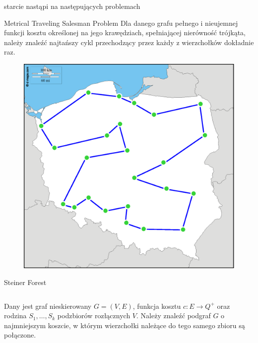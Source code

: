 \documentclass[final,hyperref={pdfpagelabels=false}]{beamer}
\begin{document}
\begin{frame}
  \begin{columns}		
    \begin{column}{.96\textwidth}
      \vspace{1cm}
      \begin{center}
        \veryHuge starcie nastąpi na następujących problemach
      \end{center}
      \vspace{1cm}

      \begin{block}{Metrical Traveling Salesman Problem}
        Dla danego grafu pełnego i nieujemnej funkcji kosztu określonej na jego krawędziach,
		spełniającej nierówność trójkąta, należy znaleźć najtańszy cykl przechodzący
		przez każdy z wierzchołków dokładnie raz.
		\begin{figure}
			\centering
			\includegraphics{poland_cities_cycle.eps}
		\end{figure}
      \end{block}

      \begin{block}{Steiner Forest}
        \begin{minipage}{.48\linewidth}

          \begin{columns}
            \begin{column}{.58\linewidth}
              Dany jest graf nieskierowany $G = (V, E)$, funkcja kosztu $c: E
              \rightarrow Q^+$ oraz rodzina $S_1, \hdots, S_k$ podzbiorów
              rozłącznych $V$. Należy znaleźć podgraf $G$ o najmniejszym
              koszcie, w którym wierzchołki należące do tego samego zbioru są
              połączone.
            \end{column}


\end{columns}
\end{minipage}
\end{block}
\end{column}
\end{columns}
\end{frame}
\end{document}
